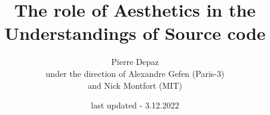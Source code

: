 \documentclass{book}
\begin{document}
\title{The role of Aesthetics in the Understandings of Source code}
\author{Pierre Depaz\\under the direction of Alexandre Gefen (Paris-3)\\and Nick Montfort (MIT)}
\date{last updated - 3.12.2022}
\maketitle



\pagebreak



\pagebreak






\end{document}
